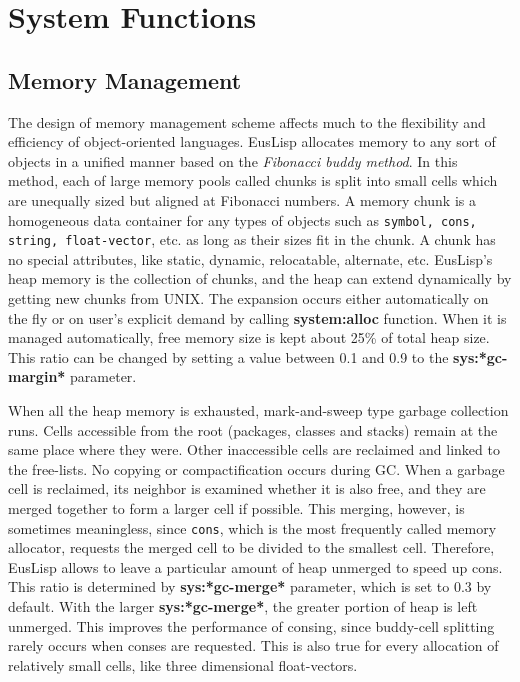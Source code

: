 \section{System Functions}

\subsection{Memory Management}
The design of  memory management scheme affects much to the flexibility and
efficiency of object-oriented languages.
EusLisp allocates memory to any sort of objects
in a unified manner based on the {\em Fibonacci buddy method}.
In this method, each of large memory pools called chunks is split into
small cells which are unequally sized but aligned at Fibonacci numbers.
A memory chunk is a homogeneous data container for any types of
objects such as {\tt symbol, cons, string, float-vector}, etc.
as long as their sizes fit in the chunk.
A chunk has no special attributes,
like static, dynamic, relocatable, alternate, etc.
EusLisp's heap memory is the collection of chunks, and 
the heap can extend dynamically by getting new chunks from UNIX.
The expansion occurs either automatically on the fly
or on user's explicit demand by calling {\bf system:alloc} function.
When it is managed automatically, free memory size is kept
about 25\% of total heap size.
This ratio can be changed by setting a value between 0.1 and 0.9 to
the {\bf sys:*gc-margin*} parameter.

When all the heap memory is exhausted, mark-and-sweep type garbage collection
runs.
Cells accessible from the root (packages, classes and stacks) remain at the
same place where they were.
Other inaccessible cells are reclaimed and linked to the free-lists.
No copying or compactification occurs during GC.
When a garbage cell is reclaimed, its neighbor is examined
whether it is also free,
and they are merged together to form a larger cell if possible.
This merging, however, is sometimes meaningless,
since {\tt cons}, which is the most frequently called memory allocator,
requests the merged cell to be divided to the smallest cell.
Therefore, EusLisp allows to leave a particular amount of heap unmerged to speed up cons.
This ratio is determined by {\bf sys:*gc-merge*} parameter,
which is set to 0.3 by default.
With the larger {\bf sys:*gc-merge*}, the greater portion of  heap is left unmerged.
This improves the performance of consing,
since buddy-cell splitting rarely occurs when conses are requested.
This is also true for every allocation of relatively small cells,
like three dimensional float-vectors.

